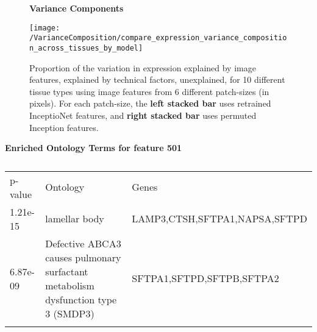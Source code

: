 \documentclass{article}
\newcommand*{\figuretitle}[1]{%
    {\centering%
    \textbf{#1}%
    \par\medskip}%
}
\begin{document}
\begin{figure}[h]
  \figuretitle{Variance Components}
  \centering
    \texttt{[image: /VarianceComposition/compare\_expression\_variance\_composition\_across\_tissues\_by\_model]} 
  \caption{Proportion of the variation in expression \textcolor{figgreen}{explained by image features}, \textcolor{figpurple}{explained by technical factors}, \textcolor{figorange}{unexplained}, for 10 different tissue types using image features from 6 different patch-sizes (in pixels). For each patch-size, the \textbf{left stacked bar} uses retrained InceptioNet features, and \textbf{right stacked bar} uses permuted Inception features.}
  \label{fig:variance_composition}
\end{figure}

%
%

\begin{table}[H]
\figuretitle{Enriched Ontology Terms for feature 501}
\caption{}
\label{tab:image_feature_pcs_and_tfs}       %

\begin{tabular}{p{2cm}p{6cm}p{6cm}}
\hline\noalign{\smallskip}
p-value & Ontology & Genes  \\
1.21e-15 & lamellar body & LAMP3,CTSH,SFTPA1,NAPSA,SFTPD  \\
6.87e-09 & Defective ABCA3 causes pulmonary surfactant metabolism dysfunction type 3 (SMDP3) & SFTPA1,SFTPD,SFTPB,SFTPA2 \\


\noalign{\smallskip}\hline\noalign{\smallskip}
\end{tabular}
\end{table}


%
%
\end{document}
